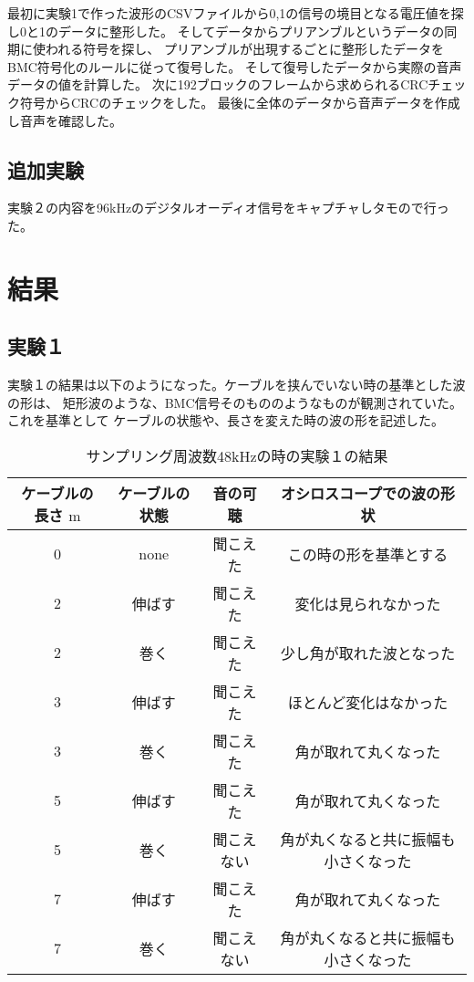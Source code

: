 \documentclass[11pt,a4j]{jsarticle}
\begin{document}
最初に実験1で作った波形のCSVファイルから0,1の信号の境目となる電圧値を探し0と1のデータに整形した。
そしてデータからプリアンブルというデータの同期に使われる符号を探し、
プリアンブルが出現するごとに整形したデータをBMC符号化のルールに従って復号した。
そして復号したデータから実際の音声データの値を計算した。
次に192ブロックのフレームから求められるCRCチェック符号からCRCのチェックをした。
最後に全体のデータから音声データを作成し音声を確認した。

\subsection{追加実験}
\label{sub:追加実験}

実験２の内容を96kHzのデジタルオーディオ信号をキャプチャしタモので行った。


\section{結果}

\subsection{実験１}
\label{sub:実験１結果}

実験１の結果は以下のようになった。ケーブルを挟んでいない時の基準とした波の形は、
矩形波のような、BMC信号そのもののようなものが観測されていた。これを基準として
ケーブルの状態や、長さを変えた時の波の形を記述した。

\begin{table}[H]
  \caption{サンプリング周波数48kHzの時の実験１の結果}
  \label{tab:j1result48}
  \begin{center}
      \begin{tabular}{cccc}
        \hline
				ケーブルの長さ $\mathrm{m}$	&	ケーブルの状態	&	音の可聴	&	オシロスコープでの波の形状	\\
				\hline  \hline
				0	&	none	&	聞こえた	&	この時の形を基準とする	\\
				2	&	伸ばす	&	聞こえた	&	変化は見られなかった	\\
				2	&	巻く	&	聞こえた	&	少し角が取れた波となった	\\
				3	&	伸ばす	&	聞こえた	&	ほとんど変化はなかった	\\
				3	&	巻く	&	聞こえた	&	角が取れて丸くなった	\\
				5	&	伸ばす	&	聞こえた	&	角が取れて丸くなった	\\
				5	&	巻く	&	聞こえない	&	角が丸くなると共に振幅も小さくなった	\\
				7	&	伸ばす	&	聞こえた	&	角が取れて丸くなった	\\
				7	&	巻く	&	聞こえない	&	角が丸くなると共に振幅も小さくなった	\\ \hline
      \end{tabular}
  \end{center}
\end{table}
\end{document}
